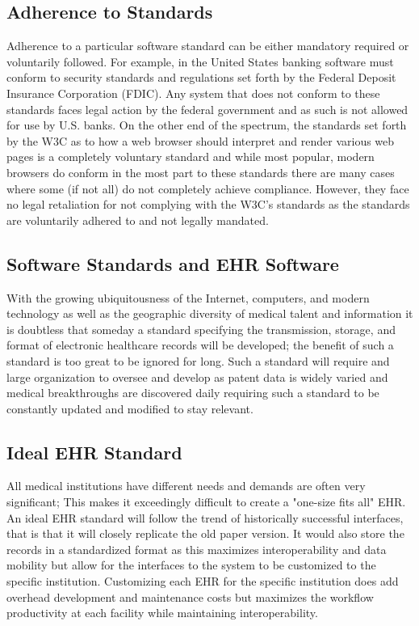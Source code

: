 \documentclass[14pt]{article}
\begin{document}
\subsection{Adherence to Standards}
Adherence to a particular software standard can be either mandatory required or voluntarily followed. For example, in the United States banking software must conform to security standards and regulations set forth by the Federal Deposit Insurance Corporation (FDIC). Any system that does not conform to these standards faces legal action by the federal government and as such is not allowed for use by U.S. banks. On the other end of the spectrum, the standards set forth by the W3C as to how a web browser should interpret and render various web pages is a completely voluntary standard and while most popular, modern browsers do conform in the most part to these standards there are many cases where some (if not all) do not completely achieve compliance. However, they face no legal retaliation for not complying with the W3C's standards as the standards are voluntarily adhered to and not legally mandated.

\subsection{Software Standards and EHR Software}
With the growing ubiquitousness of the Internet, computers, and modern technology as well as the geographic diversity of medical talent and information it is doubtless that someday a standard specifying the transmission, storage, and format of electronic healthcare records will be developed; the benefit of such a standard is too great to be ignored for long. Such a standard will require and large organization to oversee and develop as patent data is widely varied and medical breakthroughs are discovered daily requiring such a standard to be constantly updated and modified to stay relevant. 

\subsection{Ideal EHR Standard}
All medical institutions have different needs and demands  are often very significant; This makes it exceedingly difficult to create a "one-size fits all" \gls{EHR}. An ideal \gls{EHR} standard will follow the trend of historically successful interfaces, that is that it will closely replicate the old paper version. It would also store the records in a standardized format as this maximizes interoperability and data mobility but allow for the interfaces to the system to be customized to the specific institution. Customizing each \gls{EHR} for the specific institution does add overhead development and maintenance costs but maximizes the workflow productivity at each facility while maintaining interoperability. 
\end{document}
